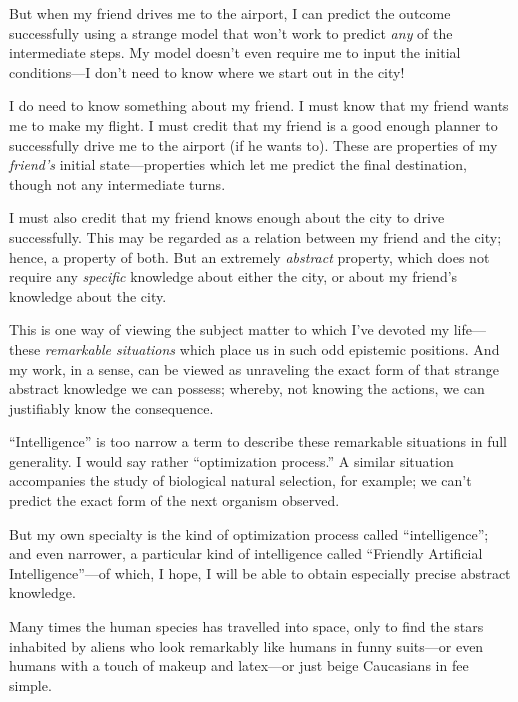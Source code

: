  But when my friend drives me to the airport, I can predict the
outcome successfully using a strange model that won't
work to predict \textit{any} of the intermediate steps. My model
doesn't even require me to input the initial
conditions---I don't need to know where we start out in
the city!


 I do need to know something about my friend. I must know that my
friend wants me to make my flight. I must credit that my friend is a
good enough planner to successfully drive me to the airport (if he
wants to). These are properties of my \textit{friend's}
initial state---properties which let me predict the final destination,
though not any intermediate turns.


 I must also credit that my friend knows enough about the city to
drive successfully. This may be regarded as a relation between my
friend and the city; hence, a property of both. But an extremely
\textit{abstract} property, which does not require any
\textit{specific} knowledge about either the city, or about my
friend's knowledge about the city.


 This is one way of viewing the subject matter to which
I've devoted my life---these \textit{remarkable
situations} which place us in such odd epistemic positions. And my
work, in a sense, can be viewed as unraveling the exact form of that
strange abstract knowledge we can possess; whereby, not knowing the
actions, we can justifiably know the consequence.


 ``Intelligence'' is too narrow
a term to describe these remarkable situations in full generality. I
would say rather ``optimization
process.'' A similar situation accompanies the study
of biological natural selection, for example; we can't
predict the exact form of the next organism observed.


 But my own specialty is the kind of optimization process called
``intelligence''; and even narrower,
a particular kind of intelligence called ``Friendly
Artificial Intelligence''---of which, I hope, I will
be able to obtain especially precise abstract knowledge.

\myendsectiontext



 Many times the human species has travelled into space, only to
find the stars inhabited by aliens who look remarkably like humans in
funny suits---or even humans with a touch of makeup and latex---or just
beige Caucasians in fee simple.


 ~

